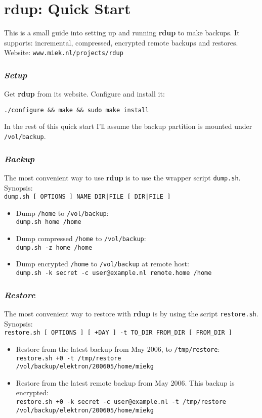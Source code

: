 \documentclass[a4paper, openany]{memoir}
\newcommand{\rdup}{\textbf{rdup}}
\newcommand{\cmd}[1]{\texttt{#1}}
\newcommand{\url}[1]{\texttt{#1}}
\newcommand{\path}[1]{\texttt{#1}}
\begin{document}
\chapter*{\rdup: Quick Start}
This is a small guide into setting up and running \rdup{} to make backups. It
supports: incremental, compressed, encrypted remote backups and
restores. Website: \url{www.miek.nl/projects/rdup}

\subsection*{\textit{Setup}}
Get \rdup{} from its website. Configure and install it:
\begin{verbatim}
./configure && make && sudo make install
\end{verbatim}
In the rest of this quick start I'll assume the backup partition
is mounted under \path{/vol/backup}.

\subsection*{\textit{Backup}}
The most convenient way to use \rdup{} is to use the wrapper
script \cmd{dump.sh}. Synopsis:\\
\cmd{dump.sh [ OPTIONS ] NAME DIR|FILE [ DIR|FILE ]}
\begin{itemize}
\item
Dump \path{/home} to \path{/vol/backup}:\\
\cmd{dump.sh home /home} 
\item
Dump compressed \path{/home} to \path{/vol/backup}:\\
\cmd{dump.sh -z home /home} 
\item
Dump encrypted \path{/home} to \path{/vol/backup} at remote
host:\\
\cmd{dump.sh -k secret -c user@example.nl remote.home /home}
\end{itemize}

\subsection*{\textit{Restore}}
The most convenient way to restore with \rdup{} is by using
the script \cmd{restore.sh}. Synopsis:\\
\cmd{restore.sh [ OPTIONS ] [ +DAY ] -t TO\_DIR FROM\_DIR [ FROM\_DIR ]}
\begin{itemize}
\item
Restore from the latest backup from May 2006, to \path{/tmp/restore}:\\
\cmd{restore.sh +0 -t /tmp/restore \\
/vol/backup/elektron/200605/home/miekg}
\item
Restore from the latest remote backup from May 2006. This backup
is encrypted:\\
\cmd{restore.sh +0 -k secret -c user@example.nl -t /tmp/restore \\
/vol/backup/elektron/200605/home/miekg}
\end{itemize}
\end{document}
